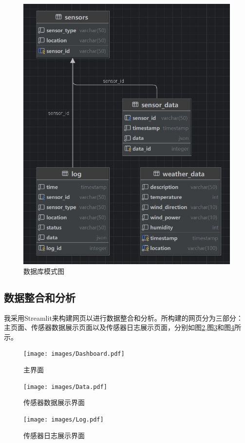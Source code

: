 \begin{figure}[!htbp]
    \centering
    \includegraphics[width=\textwidth]{images/db.png}
    \caption{数据库模式图}\label{db}
\end{figure}

\subsection{数据整合和分析}

我采用Streamlit来构建网页以进行数据整合和分析。所构建的网页分为三部分：主页面、传感器数据展示页面以及传感器日志展示页面，分别如图\ref{Dashboard},图\ref{Data}和图\ref{Log}所示。

\begin{figure}[!htbp]
    \centering
    \texttt{[image: images/Dashboard.pdf]}
    \caption{主界面}\label{Dashboard}
\end{figure}

\begin{figure}[!htbp]
    \centering
    \texttt{[image: images/Data.pdf]}
    \caption{传感器数据展示界面}\label{Data}
\end{figure}

\begin{figure}[!htbp]
    \centering
    \texttt{[image: images/Log.pdf]}
    \caption{传感器日志展示界面}\label{Log}
\end{figure}